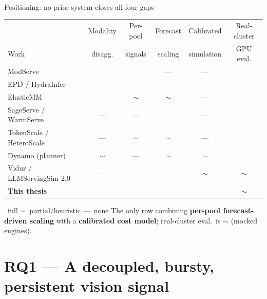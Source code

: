 \documentclass[11pt,aspectratio=169]{beamer}
\newcommand{\cmark}{\textcolor{teal!65!black}{\checkmark}}
\begin{document}
\begin{frame}{Positioning: no prior system closes all four gaps}
  \centering
  \footnotesize
  \setlength{\tabcolsep}{5pt}\renewcommand{\arraystretch}{1.0}
  \begin{tabular}{@{}>{\raggedright\arraybackslash}p{3.7cm}ccccc@{}}
    \toprule
      & Modality & Per-pool & Forecast & Calibrated & Real-cluster \\
    Work & disagg. & signals & scaling & simulation & GPU eval. \\
    \midrule
    ModServe                 & \cmark & \cmark & ---    & ---    & \cmark \\
    EPD / HydraInfer         & \cmark & ---    & ---    & ---    & \cmark \\
    ElasticMM                & \cmark & $\sim$ & $\sim$ & ---    & \cmark \\
    SageServe / WarmServe    & ---    & ---    & \cmark & ---    & \cmark \\
    TokenScale / HeteroScale & ---    & $\sim$ & $\sim$ & ---    & \cmark \\
    Dynamo (planner)         & $\sim$ & ---    & $\sim$ & $\sim$ & \cmark \\
    Vidur / LLMServingSim 2.0& ---    & ---    & ---    & $\sim$ & $\sim$ \\
    \midrule
    \rowcolor{blue!8}\textbf{This thesis} & \cmark & \cmark & \cmark & \cmark & $\sim$ \\
    \bottomrule
  \end{tabular}
  \vspace{0.7ex}\par
  {\scriptsize \cmark~full \quad $\sim$~partial/heuristic \quad ---~none \qquad
  The only row combining \textbf{per-pool forecast-driven scaling} with a
  \textbf{calibrated cost model}; real-cluster eval.\ is $\sim$ (mocked engines).}
\end{frame}

\section{RQ1 --- A decoupled, bursty, persistent vision signal}
\end{document}
